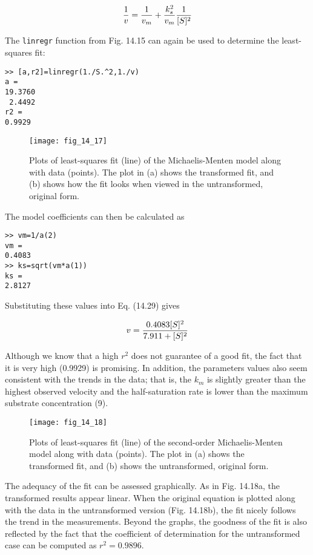 \documentclass[../main.tex]{subfiles}
\begin{document}
\begin{equation}
	\notag
	\frac{1}{v} = \frac{1}{v_m} + \frac{k^2_s}{v_m} \frac{1}{[S]^2}
\end{equation}

The \texttt{linregr} function from Fig. 14.15 can again be used to determine the least-squares fit:

\begin{lstlisting}[numbers=none] 
>> [a,r2]=linregr(1./S.^2,1./v)
a =
19.3760
 2.4492
r2 =
0.9929
\end{lstlisting}

\begin{figure}[H] 
	\centering
	\texttt{[image: fig\_14\_17]}
	\caption{\textsf{Plots of least-squares fit (line) of the Michaelis-Menten model along with data (points). The plot in (a) shows the transformed fit, and (b) shows how the fit looks when viewed in the untransformed, original form.}}
	\label{fig:fig_14_17}
\end{figure}

\noindent The model coefficients can then be calculated as

\begin{lstlisting}[numbers=none] 
>> vm=1/a(2)
vm =
0.4083
>> ks=sqrt(vm*a(1))
ks =
2.8127
\end{lstlisting}

\noindent Substituting these values into Eq. (14.29) gives

\begin{equation}
	\notag
	v = \frac{0.4083[S]^2}{7.911 + [S]^2}
\end{equation}

Although we know that a high $r^2$ does not guarantee of a good fit, the fact that it is very high (0.9929) is promising. In addition, the parameters values also seem consistent with the trends in the data; that is, the $k_m$ is slightly greater than the highest observed velocity and the half-saturation rate is lower than the maximum substrate concentration (9).

\begin{figure}[H] 
	\centering
	\texttt{[image: fig\_14\_18]}
	\caption{\textsf{Plots of least-squares fit (line) of the second-order Michaelis-Menten model along with data (points). The plot in (a) shows the transformed fit, and (b) shows the untransformed, original form.}}
	\label{fig:fig_14_18}
\end{figure}

The adequacy of the fit can be assessed graphically. As in Fig. 14.18a, the transformed results appear linear. When the original equation is plotted along with the data in the untransformed version (Fig. 14.18b), the fit nicely follows the trend in the measurements. Beyond the graphs, the goodness of the fit is also reflected by the fact that the coefficient of determination for the untransformed case can be computed as $r^2 = 0.9896$.
\end{document}

